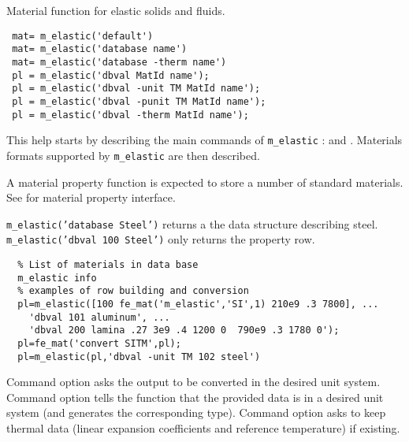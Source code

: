 

 Material function for elastic solids and fluids.

\rsyntax\begin{verbatim}
 mat= m_elastic('default') 
 mat= m_elastic('database name') 
 mat= m_elastic('database -therm name') 
 pl = m_elastic('dbval MatId name');
 pl = m_elastic('dbval -unit TM MatId name');
 pl = m_elastic('dbval -punit TM MatId name');
 pl = m_elastic('dbval -therm MatId name');
\end{verbatim}


This help starts by describing the main commands of {\tt m\_elastic} :  and . Materials formats supported by {\tt m\_elastic} are then described.

\ruic{m\_elastic}{Database}{,\htr{m\_elastic}{Dbval}] [-unit TY] [,MatiD]] Name} %

A material property function is expected to store a number of standard materials. See  for material property interface.

{\tt m\_elastic('database Steel')} returns a the data structure describing steel.\\
{\tt m\_elastic('dbval 100 Steel')} only returns the property row. 

\begin{verbatim}
  % List of materials in data base
  m_elastic info
  % examples of row building and conversion
  pl=m_elastic([100 fe_mat('m_elastic','SI',1) 210e9 .3 7800], ...
    'dbval 101 aluminum', ...
    'dbval 200 lamina .27 3e9 .4 1200 0  790e9 .3 1780 0');
  pl=fe_mat('convert SITM',pl);
  pl=m_elastic(pl,'dbval -unit TM 102 steel')
\end{verbatim}%

Command option  asks the output to be converted in the desired unit system.
Command option  tells the function that the provided data is in a desired unit system (and generates the corresponding type).
Command option  asks to keep thermal data (linear expansion coefficients and reference temperature) if existing.

